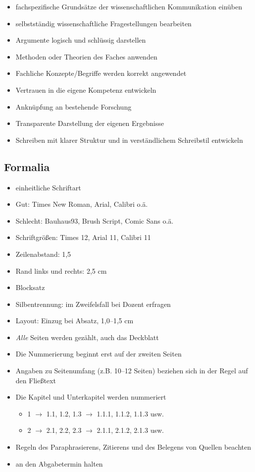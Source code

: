 \documentclass[ 12pt,
                titlepage,
                parskip=half,
                version=first,
                bibliography=totocnumbered,
                final,
                listof=totoc]{scrartcl}
\begin{document}
\begin{itemize}
    \item fachspezifische Grundsätze der wissenschaftlichen Kommunikation
    einüben
    \item selbstständig wissenschaftliche Fragestellungen bearbeiten
    \item Argumente logisch und schlüssig darstellen
    \item Methoden oder Theorien des Faches anwenden
    \item Fachliche Konzepte/Begriffe werden korrekt angewendet
    \item Vertrauen in die eigene Kompetenz entwickeln
    \item Anknüpfung an bestehende Forschung
    \item Transparente Darstellung der eigenen Ergebnisse
    \item Schreiben mit klarer Struktur und in verständlichem Schreibstil
    entwickeln
\end{itemize}

\subsection{Formalia}

\begin{itemize}
    \item einheitliche Schriftart
    \item Gut: Times New Roman, Arial, Calibri o.ä.
    \item Schlecht: Bauhaus93, Brush Script, Comic Sans o.ä.
    \item Schriftgrößen: Times 12, Arial 11, Calibri 11
    \item Zeilenabstand: 1,5
    \item Rand links und rechts: 2,5 cm
    \item Blocksatz
    \item Silbentrennung: im Zweifelsfall bei Dozent erfragen
    \item Layout: Einzug bei Absatz, 1,0--1,5 cm
    \item \emph{Alle} Seiten werden gezählt, auch das Deckblatt
    \item Die Nummerierung beginnt erst auf der zweiten Seiten
    \item Angaben zu Seitenumfang (z.B. 10--12 Seiten) beziehen sich in der
    Regel auf den Fließtext
    \item Die Kapitel und Unterkapitel werden nummeriert
\begin{itemize}
    \item[] 1 $\rightarrow$ 1.1, 1.2, 1.3 $\rightarrow$ 1.1.1, 1.1.2, 1.1.3 usw.
    \item[] 2 $\rightarrow$ 2.1, 2.2, 2.3 $\rightarrow$ 2.1.1, 2.1.2, 2.1.3 usw.
\end{itemize}
    \item Regeln des Paraphrasierens, Zitierens und des Belegens von Quellen
    beachten
    \item an den Abgabetermin halten
\end{itemize}
\end{document}
